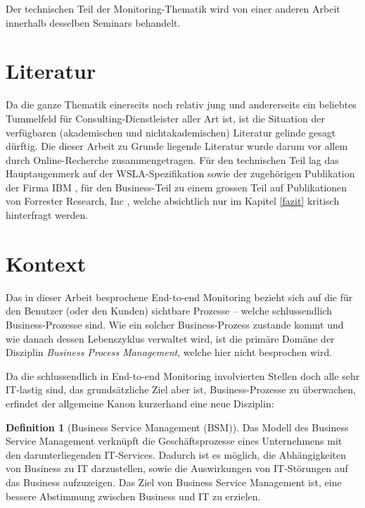 \documentclass[11pt,listof=totoc]{scrreprt} %
\theoremstyle{definition}
\newtheorem{definition}{Definition}
\begin{document}
Der technischen Teil der Monitoring-Thematik wird von einer anderen Arbeit innerhalb desselben Seminars behandelt.

\section{Literatur}

Da die ganze Thematik einerseits noch relativ jung und andererseits ein beliebtes Tummelfeld für Consulting-Dienstleister aller Art ist, ist die Situation der verfügbaren (akademischen und nichtakademischen) Literatur gelinde gesagt dürftig. Die dieser Arbeit zu Grunde liegende Literatur wurde darum vor allem durch Online-Recherche zusammengetragen. Für den technischen Teil lag das Hauptaugenmerk auf der WSLA-Spezifikation sowie der zugehörigen Publikation der Firma IBM \cite{ibm:wslaSpec, ibm:wslaPaper}, für den Business-Teil zu einem grossen Teil auf Publikationen von Forrester Research, Inc \cite{forrester:bsm, forrester:implementingBsm, forrester:slaBestPractices, stephenmann}, welche absichtlich nur im Kapitel \ref{fazit} kritisch hinterfragt werden.

\section{Kontext}

Das in dieser Arbeit besprochene End-to-end Monitoring bezieht sich auf die für den Benutzer (oder den Kunden) sichtbare Prozesse -- welche schlussendlich Business-Prozesse sind. Wie ein solcher Business-Prozess zustande kommt und wie danach dessen Lebenszyklus verwaltet wird, ist die primäre Domäne der Disziplin {\em Business Process Management}, welche hier nicht besprochen wird.

Da die schlussendlich in End-to-end Monitoring involvierten Stellen doch alle sehr IT-lastig sind, das grundsätzliche Ziel aber ist, Business-Prozesse zu überwachen, erfindet der allgemeine Kanon kurzerhand eine neue Disziplin:

\begin{definition}[Business Service Management (BSM)]
Das Modell des Business Service Management verknüpft die Geschäftsprozesse eines Unternehmens mit den darunterliegenden IT-Services. Dadurch ist es möglich, die Abhängigkeiten von Business zu IT darzustellen, sowie die Auswirkungen von IT-Störungen auf das Business aufzuzeigen. Das Ziel von Business Service Management ist, eine bessere Abstimmung zwischen Business und IT zu erzielen. \cite{wiki:bsm}
\end{definition}
\end{document}
